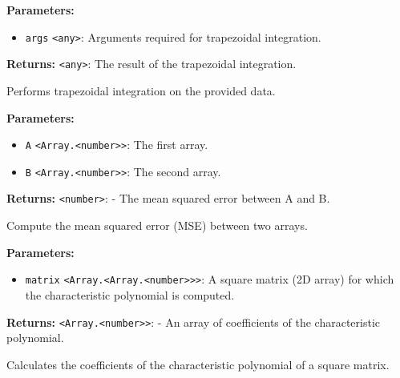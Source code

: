\documentclass[12pt,a4paper]{article}
\begin{document}
\vspace{5mm}
\noindent {}


\noindent \textbf{Parameters:}
\begin{itemize}
  \item \texttt{args} \texttt{<any>}: Arguments required for trapezoidal integration.
\end{itemize}

\noindent \textbf{Returns:} \texttt{<any>}: The result of the trapezoidal integration.

\noindent Performs trapezoidal integration on the provided data.

\vspace{5mm}
\noindent {}


\noindent \textbf{Parameters:}
\begin{itemize}
  \item \texttt{A} \texttt{<Array.<number>>}: The first array.
  \item \texttt{B} \texttt{<Array.<number>>}: The second array.
\end{itemize}

\noindent \textbf{Returns:} \texttt{<number>}: - The mean squared error between A and B.

\noindent Compute the mean squared error (MSE) between two arrays.

\vspace{5mm}
\noindent {}


\noindent \textbf{Parameters:}
\begin{itemize}
  \item \texttt{matrix} \texttt{<Array.<Array.<number>>>}: A square matrix (2D array) for which the characteristic polynomial is computed.
\end{itemize}

\noindent \textbf{Returns:} \texttt{<Array.<number>>}: - An array of coefficients of the characteristic polynomial.

\noindent Calculates the coefficients of the characteristic polynomial of a square matrix.
\end{document}
